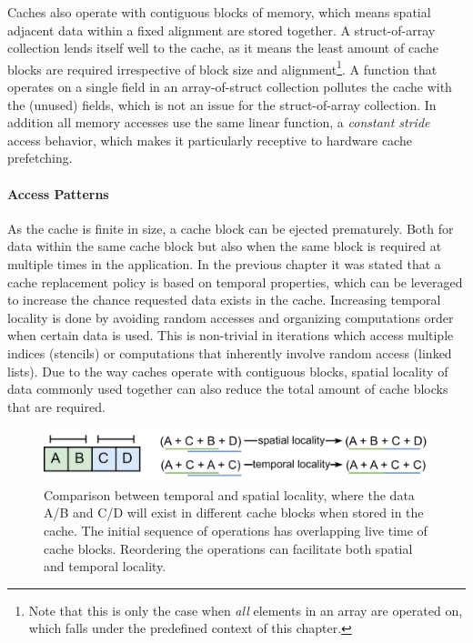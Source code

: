 \documentclass{article}
\begin{document}
Caches also operate with contiguous blocks of memory, which means spatial adjacent data within a fixed alignment are stored together.
A struct-of-array collection lends itself well to the cache, as it means the least amount of cache blocks are required irrespective of block size and alignment\footnote{Note that this is only the case when {\it all} elements in an array are operated on, which falls under the predefined context of this chapter.}.
A function that operates on a single field in an array-of-struct collection pollutes the cache with the (unused) fields, which is not an issue for the struct-of-array collection. 
In addition all memory accesses use the same linear function, a {\it constant stride} access behavior, which makes it particularly receptive to hardware cache prefetching\cite{cache-prefetching}. 

\paragraph{Access Patterns}

As the cache is finite in size, a cache block can be ejected prematurely.
Both for data within the same cache block but also when the same block is required at multiple times in the application.
In the previous chapter it was stated that a cache replacement policy is based on temporal properties, which can be leveraged to increase the chance requested data exists in the cache.
Increasing temporal locality is done by avoiding random accesses and organizing computations order when certain data is used.
This is non-trivial in iterations which access multiple indices (stencils) or computations that inherently involve random access (linked lists).
Due to the way caches operate with contiguous blocks, spatial locality of data commonly used together can also reduce the total amount of cache blocks that are required. 

\newpage

\begin{figure}[ht]
    \centering
    \includegraphics[scale=0.12]{Performance7.png}
    \caption
    {
        Comparison between temporal and spatial locality, where the data A/B and C/D will exist in different cache blocks when stored in the cache.
        The initial sequence of operations has overlapping live time of cache blocks.
        Reordering the operations can facilitate both spatial and temporal locality.
    }
\end{figure}
\end{document}
